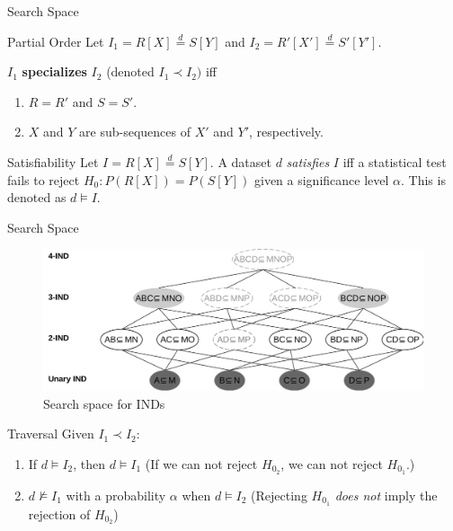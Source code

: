 \documentclass[10pt,notes]{beamer}
\newcommand{\eqdist}{\stackrel{d}{=}}
\begin{document}
\begin{frame}{Search Space}
    \begin{block}{Partial Order}
        Let $I_1 = R[X] \eqdist S[Y]$ and $I_2 = R'[X'] \eqdist S'[Y']$.
        
        $I_1$ \textbf{specializes} $I_2$ (denoted $I_1 \prec I_2)$ iff
        \begin{enumerate}
            \item $R = R'$ and $S = S'$.
            \item $X$ and $Y$ are sub-sequences of $X'$ and $Y'$, respectively.
        \end{enumerate}
    \end{block}

    \begin{block}{Satisfiability}
    Let $I = R[X] \eqdist S[Y]$.
    A dataset $d$ \emph{satisfies} $I$ iff  a statistical test fails to reject $H_0: P(R[X]) = P(S[Y])$
    given a significance level $\alpha$.
    This is denoted as $d \models I$.
    \end{block}
\end{frame}

\begin{frame}{Search Space}
\begin{figure}
    \centering
    \includegraphics[width=\textwidth]{lattice.pdf}
    \caption{Search space for INDs}
\end{figure}
\end{frame}

\begin{frame}{Traversal}
    Given $I_1 \prec I_2$:
    
    \begin{enumerate}
        \item If $d \models I_2$, then $d \models I_1$ (If we can not reject $H_{0_2}$, we can not reject $H_{0_1}$.)
        \item $d \not\models I_1$ with a probability $\alpha$ when $d \models I_2$
            (Rejecting $H_{0_1}$ \emph{does not} imply the rejection of $H_{0_2}$)
    \end{enumerate}


\end{frame}
\end{document}
